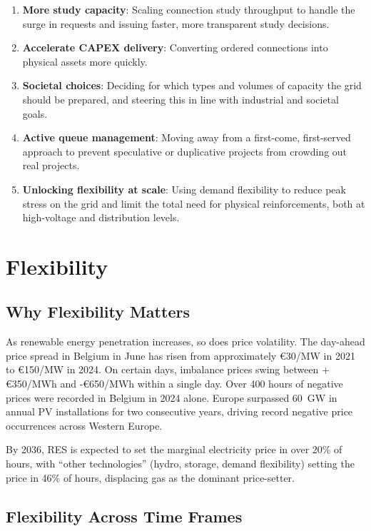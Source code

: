 \begin{enumerate}[noitemsep]
    \item \textbf{More study capacity}: Scaling connection study throughput to handle the surge in requests and issuing faster, more transparent study decisions.
    \item \textbf{Accelerate CAPEX delivery}: Converting ordered connections into physical assets more quickly.
    \item \textbf{Societal choices}: Deciding for which types and volumes of capacity the grid should be prepared, and steering this in line with industrial and societal goals.
    \item \textbf{Active queue management}: Moving away from a first-come, first-served approach to prevent speculative or duplicative projects from crowding out real projects.
    \item \textbf{Unlocking flexibility at scale}: Using demand flexibility to reduce peak stress on the grid and limit the total need for physical reinforcements, both at high-voltage and distribution levels.
\end{enumerate}

\section{Flexibility}

\subsection{Why Flexibility Matters}

As renewable energy penetration increases, so does price volatility. The day-ahead price spread in Belgium in June has risen from approximately \euro30/MW in 2021 to \euro150/MW in 2024. On certain days, imbalance prices swing between +\euro350/MWh and -\euro650/MWh within a single day. Over 400 hours of negative prices were recorded in Belgium in 2024 alone. Europe surpassed 60~GW in annual PV installations for two consecutive years, driving record negative price occurrences across Western Europe.

By 2036, RES is expected to set the marginal electricity price in over 20\% of hours, with ``other technologies'' (hydro, storage, demand flexibility) setting the price in 46\% of hours, displacing gas as the dominant price-setter.

\subsection{Flexibility Across Time Frames}

